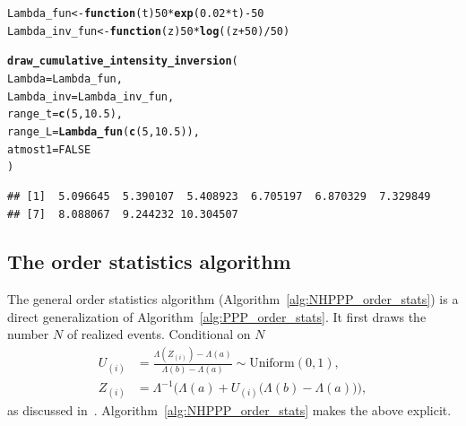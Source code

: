 \documentclass[article]{jss}\usepackage[]{graphicx}\usepackage[]{xcolor}
\makeatletter
\newcommand{\hlnum}[1]{\textcolor[rgb]{0.686,0.059,0.569}{#1}}%
\newcommand{\hlopt}[1]{\textcolor[rgb]{0,0,0}{#1}}%
\newcommand{\hlstd}[1]{\textcolor[rgb]{0.345,0.345,0.345}{#1}}%
\newcommand{\hlkwa}[1]{\textcolor[rgb]{0.161,0.373,0.58}{\textbf{#1}}}%
\newcommand{\hlkwb}[1]{\textcolor[rgb]{0.69,0.353,0.396}{#1}}%
\newcommand{\hlkwc}[1]{\textcolor[rgb]{0.333,0.667,0.333}{#1}}%
\newcommand{\hlkwd}[1]{\textcolor[rgb]{0.737,0.353,0.396}{\textbf{#1}}}%
\newenvironment{kframe}{%
 \def\at@end@of@kframe{}%
 \ifinner\ifhmode%
  \def\at@end@of@kframe{\end{minipage}}%
  \begin{minipage}{\columnwidth}%
 \fi\fi%
 \def\FrameCommand##1{\hskip\@totalleftmargin \hskip-\fboxsep
 \colorbox{shadecolor}{##1}\hskip-\fboxsep
     \hskip-\linewidth \hskip-\@totalleftmargin \hskip\columnwidth}%
 \MakeFramed {\advance\hsize-\width
   \@totalleftmargin\z@ \linewidth\hsize
   \@setminipage}}%
 {\par\unskip\endMakeFramed%
 \at@end@of@kframe}
\newenvironment{knitrout}{}{} %
\makeatother
\begin{document}
\begin{knitrout}
\color{fgcolor}\begin{kframe}
\begin{alltt}
\hlstd{Lambda_fun} \hlkwb{<-} \hlkwa{function}\hlstd{(}\hlkwc{t}\hlstd{)} \hlnum{50} \hlopt{*} \hlkwd{exp}\hlstd{(}\hlnum{0.02} \hlopt{*} \hlstd{t)} \hlopt{-} \hlnum{50}
\hlstd{Lambda_inv_fun} \hlkwb{<-} \hlkwa{function}\hlstd{(}\hlkwc{z}\hlstd{)} \hlnum{50} \hlopt{*} \hlkwd{log}\hlstd{((z} \hlopt{+} \hlnum{50}\hlstd{)} \hlopt{/} \hlnum{50}\hlstd{)}

\hlkwd{draw_cumulative_intensity_inversion}\hlstd{(}
  \hlkwc{Lambda} \hlstd{= Lambda_fun,}
  \hlkwc{Lambda_inv} \hlstd{= Lambda_inv_fun,}
  \hlkwc{range_t} \hlstd{=} \hlkwd{c}\hlstd{(}\hlnum{5}\hlstd{,} \hlnum{10.5}\hlstd{),}
  \hlkwc{range_L} \hlstd{=} \hlkwd{Lambda_fun}\hlstd{(}\hlkwd{c}\hlstd{(}\hlnum{5}\hlstd{,} \hlnum{10.5}\hlstd{)),}
  \hlkwc{atmost1} \hlstd{=} \hlnum{FALSE}
\hlstd{)}
\end{alltt}
\begin{verbatim}
## [1]  5.096645  5.390107  5.408923  6.705197  6.870329  7.329849
## [7]  8.088067  9.244232 10.304507
\end{verbatim}
\end{kframe}
\end{knitrout}



\subsection{The order statistics algorithm}\label{sec:order-stats}
The general order statistics algorithm (Algorithm~\ref{alg:NHPPP_order_stats}) is a direct generalization of Algorithm~\ref{alg:PPP_order_stats}. It first draws the number $N$ of realized events. Conditional on $N$
\begin{equation}\label{eq:nhppp_orderstats1}
\begin{aligned}
U_{(i)} &= \frac{\Lambda(Z_{(i)}) - \Lambda(a)}{\Lambda(b)- \Lambda(a)} \sim \textrm{Uniform}(0,1), \\
Z_{(i)} &= \Lambda^{-1} \Big ( \Lambda(a) + U_{(i)} \big( \Lambda(b)- \Lambda(a) \big) \Big),
\end{aligned}
\end{equation}
as discussed in~\citet{lewis1979thinning}. Algorithm~\ref{alg:NHPPP_order_stats} makes the above explicit.


\end{document}
